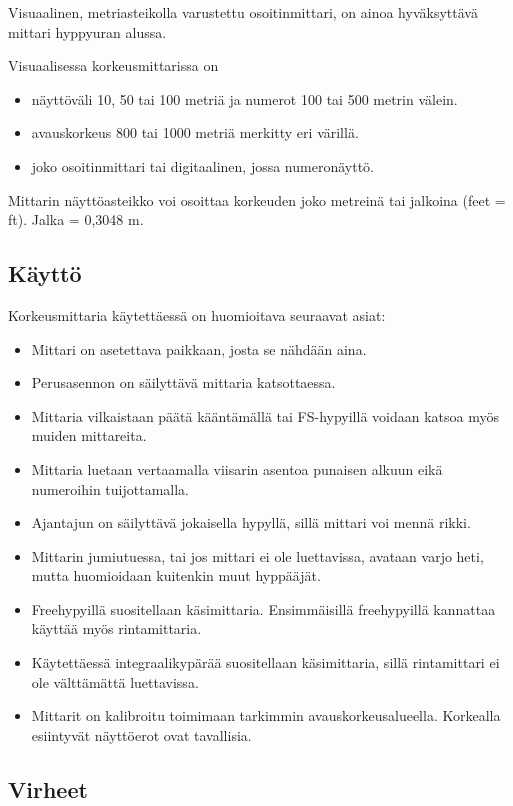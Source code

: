 Visuaalinen, metriasteikolla varustettu osoitinmittari, on ainoa hyväksyttävä mittari hyppyuran alussa.   


Visuaalisessa korkeusmittarissa on 

\begin{itemize}
\item  näyttöväli 10, 50 tai 100 metriä ja numerot 100 tai 500 metrin välein. 
\item  avauskorkeus 800 tai 1000 metriä merkitty eri värillä. 
\item  joko osoitinmittari tai digitaalinen, jossa numeronäyttö. 
\end{itemize}

Mittarin näyttöasteikko voi osoittaa korkeuden joko metreinä tai jalkoina (feet = ft). Jalka = 0,3048 m. 

\subsection{ Käyttö }
\label{hyppytapahtuma-kaytto}


Korkeusmittaria käytettäessä on huomioitava seuraavat asiat: 

\begin{itemize}
\item  Mittari on asetettava paikkaan, josta se nähdään aina. 
\item  Perusasennon on säilyttävä mittaria katsottaessa. 
\item  Mittaria vilkaistaan päätä kääntämällä tai FS-hypyillä voidaan katsoa myös muiden mittareita. 
\item  Mittaria luetaan vertaamalla viisarin asentoa punaisen alkuun eikä numeroihin tuijottamalla. 
\item  Ajantajun on säilyttävä jokaisella hypyllä, sillä mittari voi mennä rikki.  
\item  Mittarin jumiutuessa, tai jos mittari ei ole luettavissa, avataan varjo heti, mutta huomioidaan kuitenkin muut hyppääjät. 
\item  Freehypyillä suositellaan käsimittaria. Ensimmäisillä freehypyillä kannattaa käyttää myös rintamittaria. 
\item  Käytettäessä integraalikypärää suositellaan käsimittaria, sillä rintamittari ei ole välttämättä luettavissa. 
\item  Mittarit on kalibroitu toimimaan tarkimmin avauskorkeusalueella. Korkealla esiintyvät näyttöerot ovat tavallisia.  
\end{itemize}
\subsection{ Virheet }
\label{hyppytapahtuma-virheet}


